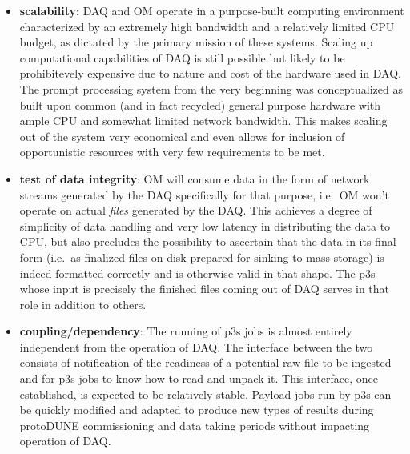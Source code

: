 \documentclass[pdftex,12pt,letter]{article}
\newcommand{\pd}{protoDUNE\xspace}
\begin{document}
\begin{itemize}

\item \textbf{scalability}: DAQ and OM operate in a purpose-built computing environment characterized
by an extremely high bandwidth and a relatively limited CPU budget, as dictated by the
primary mission of these systems. Scaling up computational capabilities of DAQ
is still possible but likely to be prohibitevely expensive due to nature and cost of
the hardware used in DAQ. The prompt processing system from the very beginning
was conceptualized as built upon common (and in fact recycled) general purpose hardware
with ample CPU and somewhat limited network bandwidth. This makes scaling out of
the system very economical and even allows for inclusion of opportunistic resources
with very few requirements to be met.

\item \textbf{test of data integrity}: OM will consume data in the form of network streams generated
by the DAQ specifically for that purpose, i.e.~OM won't operate on actual \textit{files} generated
by the DAQ. This achieves a degree of simplicity of data handling and very low latency
in distributing the data to CPU, but also precludes the possibility to ascertain that the data
in its final form (i.e.~as finalized files on disk prepared for sinking to mass storage) is indeed
formatted correctly and is otherwise valid in that shape. The p3s whose input is precisely the finished
files coming out of DAQ serves in that role in addition to others.

\item \textbf{coupling/dependency}: 
  The running of p3s jobs is almost entirely independent from the operation of DAQ.
  The interface between the two consists of notification of the readiness of a potential raw file to be ingested and for p3s jobs to know how to read and unpack it.  This interface, once established, is expected to be relatively stable.
  Payload jobs run by p3s can be quickly modified
and adapted to produce new types of results during \pd commissioning and
data taking periods without impacting operation of DAQ.



\end{itemize}
\end{document}
